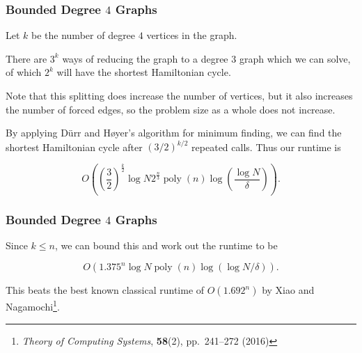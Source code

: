 \documentclass[]{beamer}
\DeclareMathOperator{\poly}{poly}
\begin{document}
\begin{frame}
\frametitle{Bounded Degree $4$ Graphs}
Let $k$ be the number of degree $4$ vertices in the graph.

There are $3^k$ ways of reducing the graph to a degree $3$ graph which we can solve, of which $2^k$ will have the shortest Hamiltonian cycle.

Note that this splitting does increase the number of vertices, but it also increases the number of forced edges, so the problem size as a whole does not increase.

By applying D\"urr and H\o yer's algorithm for minimum finding, we can find the shortest Hamiltonian cycle after $(3/2)^{k/2}$ repeated calls. Thus our runtime is

$$O\left(\left(\frac{3}{2}\right)^{\frac{k}{2}}\log N2^{\frac{n}{3}}\poly(n)\log\left(\frac{\log N}{\delta}\right)\right).$$
\end{frame}

\begin{frame}
\frametitle{Bounded Degree $4$ Graphs}

Since $k \leq n$, we can bound this and work out the runtime to be

$$O(1.375^n\log N\poly(n)\log(\log N/\delta)).$$

This beats the best known classical runtime of $O(1.692^n)$ by Xiao and Nagamochi\footnote{{\em Theory of Computing Systems}, {\bf 58}(2), pp.\ 241--272 (2016)}.
\end{frame}
\end{document}
